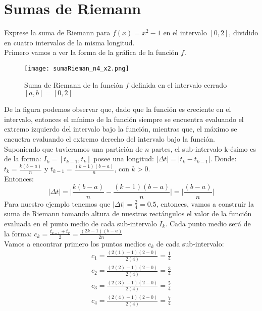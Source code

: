 		\section{Sumas de Riemann} %
		\label{sec:sumas_de_riemann}
			\begin{ejer}[2]
		    Exprese la suma de Riemann para $f(x) = x^2 - 1$ en el intervalo $[0,2]$, dividido en cuatro intervalos de la misma longitud. \\
		    Primero vamos a ver la forma de la gráfica de la función $f$. 
		    \begin{figure}[h]
			    \texttt{[image: sumaRieman\_n4\_x2.png]}
			    \caption{Suma de Riemann de la función $f$ definida en el intervalo cerrado $[a,b] = [0,2]$}
		    \end{figure}
		    De la figura podemos observar que, dado que la función es creciente en el intervalo, entonces el mínimo  de la función siempre se encuentra evaluando el extremo izquierdo del intervalo bajo la función, mientras que, el máximo se encuetra evaluando el extremo derecho del intervalo bajo la función. \\
		    Suponiendo que tuvieramos una partición de $n$ partes, el sub-intervalo k-ésimo es  de la forma: $I_k = [t_{k-1}, t_k]$ posee una longitud: $|\Delta t| = |t_k - t_{k-1}|$. Donde: $t_k = \frac{k(b-a)}{n}$ y $t_{k-1} = \frac{(k-1)(b-a)}{n}$, con $k > 0$. \\ 
		    Entonces: 
		    \begin{equation}
		        |\Delta t| = \Big|\frac{k(b-a)}{n} - \frac{(k-1)(b-a)}{n}\Big| = \Big|\frac{(b-a)}{n}\Big|
		    \end{equation}
		    Para nuestro ejemplo tenemos que $|\Delta t| = \frac{2}{4} = 0.5$, entonces, vamos a construir la suma de Riemann tomando altura de nuestros rectángulos el valor de la función evaluada en el punto medio de cada sub-intervalo $I_k$. Cada punto medio será de la forma: $c_k = \frac{t_{k-1} + t_k}{2} = \frac{(2k - 1)(b-a)}{2n}$ \\
		    Vamos a encontrar primero los puntos medios $c_k$ de cada sub-intervalo:
		    \begin{eqnarray*}
		        c_1 = \frac{(2(1) - 1)(2-0)}{2(4)} = \frac{1}{4} \\ 
		        c_2 = \frac{(2(2) - 1)(2-0)}{2(4)} = \frac{3}{4} \\ 
		        c_3 = \frac{(2(3) - 1)(2-0)}{2(4)} = \frac{5}{4}\\ 
		        c_4 = \frac{(2(4) - 1)(2-0)}{2(4)} = \frac{7}{4}
		    \end{eqnarray*}

\end{ejer}
